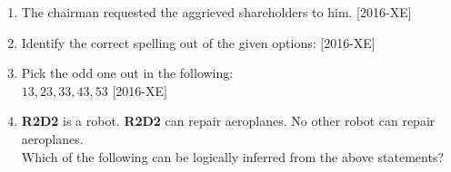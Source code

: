 \documentclass[journal]{IEEEtran}
\begin{document}
\begin{enumerate}
\item The chairman requested the aggrieved shareholders to \underline{\hspace{1cm}} him. \hfill{[2016-XE]}\\
\begin{enumerate}
\end{enumerate}
\item Identify the correct spelling out of the given options: \hfill{[2016-XE]}
\begin{enumerate}
\end{enumerate}
\item Pick the odd one out in the following:\\

$13, 23, 33, 43, 53$ \hfill{[2016-XE]}
\begin{enumerate}
\end{enumerate}
\item \textbf{R2D2} is a robot. \textbf{R2D2} can repair aeroplanes. No other robot can repair aeroplanes.\\

Which of the following can be logically inferred from the above statements? 


\end{enumerate}
\end{document}
